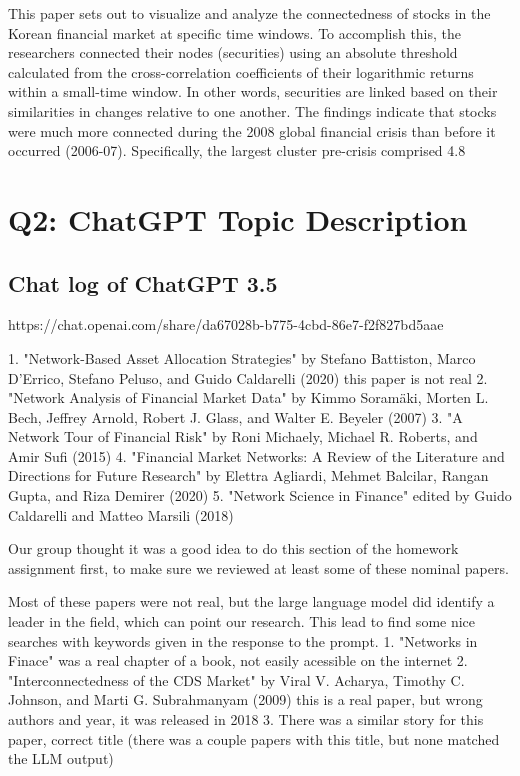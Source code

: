 \documentclass[12pt]{article}
\begin{document}
This paper sets out to visualize and analyze the connectedness of stocks in the Korean financial market at specific time windows. To accomplish this, the researchers connected their nodes (securities) using an absolute threshold calculated from the cross-correlation coefficients of their logarithmic returns within a small-time window. In other words, securities are linked based on their similarities in changes relative to one another. The findings indicate that stocks were much more connected during the 2008 global financial crisis than before it occurred (2006-07). Specifically, the largest cluster pre-crisis comprised 4.8%

\section{Q2: ChatGPT Topic Description}
\subsection{Chat log of ChatGPT 3.5}
https://chat.openai.com/share/da67028b-b775-4cbd-86e7-f2f827bd5aae

1. "Network-Based Asset Allocation Strategies" by Stefano Battiston, Marco D'Errico, Stefano Peluso, and Guido Caldarelli (2020)
this paper is not real
2. "Network Analysis of Financial Market Data" by Kimmo Soramäki, Morten L. Bech, Jeffrey Arnold, Robert J. Glass, and Walter E. Beyeler (2007)
3. "A Network Tour of Financial Risk" by Roni Michaely, Michael R. Roberts, and Amir Sufi (2015)
4. "Financial Market Networks: A Review of the Literature and Directions for Future Research" by Elettra Agliardi, Mehmet Balcilar, Rangan Gupta, and Riza Demirer (2020)
5. "Network Science in Finance" edited by Guido Caldarelli and Matteo Marsili (2018)

Our group thought it was a good idea to do this section of the homework assignment first, to make sure we reviewed at least some of these nominal papers.



Most of these papers were not real, but the large language model did identify a leader in the field, which can point our research. This lead to find some nice searches with keywords given in the response to the prompt.
1. "Networks in Finace" was a real chapter of a book, not easily acessible on the internet
2. "Interconnectedness of the CDS Market" by Viral V. Acharya, Timothy C. Johnson, and Marti G. Subrahmanyam (2009)
this is a real paper, but wrong authors and year, it was released in 2018
3. There was a similar story for this paper, correct title (there was a couple papers with this title, but none matched the LLM output)
\end{document}
